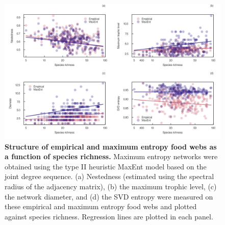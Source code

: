 \begin{figure}[h]
    \centering
    \includegraphics[width=\textwidth]{figures/S_article2/measures_richness.png}
    \caption{\textbf{Structure of empirical and maximum entropy food webs as a function of
    species richness.} Maximum entropy networks were obtained using the type II
    heuristic MaxEnt model based on the joint degree sequence. (a) Nestedness
    (estimated using the spectral radius of the adjacency matrix), (b) the maximum
    trophic level, (c) the network diameter, and (d) the SVD entropy were measured
    on these empirical and maximum entropy food webs and plotted against species
    richness. Regression lines are plotted in each
    panel.}
    \label{fig:measures_richness}
\end{figure}

\endinput
